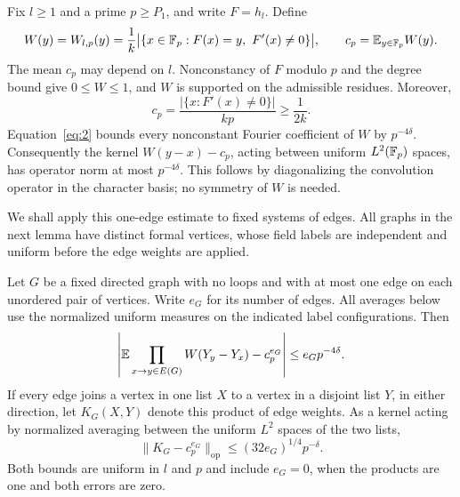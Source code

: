 Fix $l\ge1$ and a prime $p\ge P_1$, and write $F=h_l$.  Define
\[
 W(y)=W_{l,p}(y)=\frac1k
   \bigl|\{x\in\mathbb F_p:F(x)=y,\ F'(x)\ne0\}\bigr|,
 \qquad c_p=\mathbb E_{y\in\mathbb F_p}W(y).
\]
The mean $c_p$ may depend on $l$.  Nonconstancy of $F$ modulo $p$ and
the degree bound give $0\le W\le1$, and $W$ is supported on the
admissible residues.  Moreover,
\[
 c_p=\frac{\bigl|\{x:F'(x)\ne0\}\bigr|}{kp}
       \ge\frac1{2k}.
\]
Equation~\eqref{eq:2} bounds every nonconstant Fourier coefficient
of $W$ by $p^{-4\delta}$.  Consequently the kernel
$W(y-x)-c_p$, acting between uniform $L^2(\mathbb F_p)$ spaces, has operator
norm at most $p^{-4\delta}$.  This follows by diagonalizing the
convolution operator in the character basis; no symmetry of $W$ is
needed.

We shall apply this one-edge estimate to fixed systems of edges.  All
graphs in the next lemma have distinct formal vertices, whose field
labels are independent and uniform before the edge weights are applied.

\begin{lemma}
\label{tuple:list-mixing}
Let $G$ be a fixed directed graph with no loops and with at most one
edge on each unordered pair of vertices.  Write $e_G$ for its number
of edges.  All averages below use the normalized uniform measures on
the indicated label configurations.  Then
\[
 \left|\mathbb E\prod_{x\to y\in E(G)}W(Y_y-Y_x)-c_p^{e_G}\right|
       \le e_Gp^{-4\delta}.
\]
If every edge joins a vertex in one list $X$ to a vertex in a disjoint
list $Y$, in either direction, let $K_G(X,Y)$ denote this product of
edge weights.  As a kernel acting by normalized averaging between the
uniform $L^2$ spaces of the two lists,
\begin{equation}
 \|K_G-c_p^{e_G}\|_{\mathrm{op}}
       \le(32e_G)^{1/4}p^{-\delta}.
 \label{eq:3}
\end{equation}
Both bounds are uniform in $l$ and $p$ and include $e_G=0$, when the
products are one and both errors are zero.
\end{lemma}

